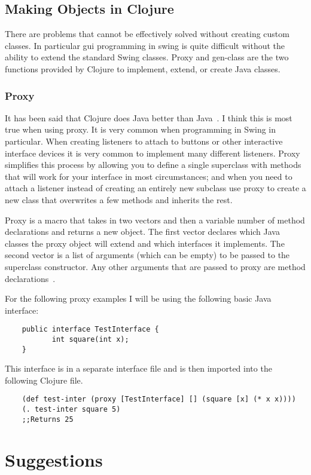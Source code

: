 \documentclass[12pt]{article}
\begin{document}
	\subsection{Making Objects in Clojure}
	There are problems that cannot be effectively solved without creating custom classes. In particular gui programming in swing is quite difficult without the ability to extend the standard Swing classes. 
Proxy and gen-class are the two functions provided by Clojure to implement, extend, or create Java classes. 
	\subsubsection{Proxy}
	It has been said that Clojure does Java better than Java~\cite{halloway:better}. I think this is most true when using proxy. It is very common when programming in Swing in particular. When creating listeners to attach to buttons or other interactive interface devices it is very common to implement many different listeners. Proxy simplifies this process by allowing you to define a single superclass with methods that will work for your interface in most circumstances; and when you need to attach a listener instead of creating an entirely new subclass use proxy to create a new class that overwrites a few methods and inherits the rest. 
	
	Proxy is a macro that takes in two vectors and then a variable number of method declarations and returns a new object. The first vector declares which Java classes the proxy object will extend and which interfaces it implements. The second vector is a list of arguments (which can be empty) to be passed to the superclass constructor. Any other arguments that are passed to proxy are method declarations~\cite{cloj:interop}. 
	
	For the following proxy examples I will be using the following basic Java interface:
	
	\begin{verbatim}
	public interface TestInterface {
	       int square(int x);
	}
	\end{verbatim}
	This interface is in a separate interface file and is then imported into the following Clojure file.
	\begin{verbatim}
	(def test-inter (proxy [TestInterface] [] (square [x] (* x x))))
	(. test-inter square 5)
	;;Returns 25
	\end{verbatim}
	
	
\section{Suggestions}\label{sec:sugg}
\end{document}
